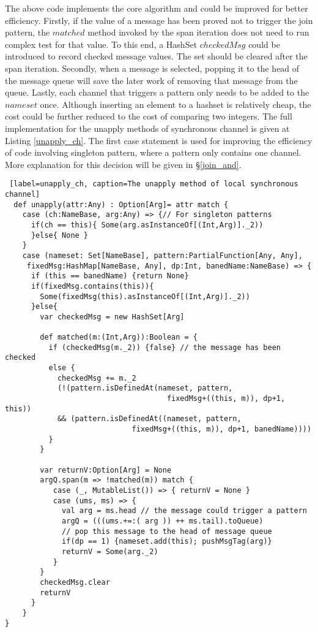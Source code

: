 The above code implements the core algorithm and could be improved for better efficiency.  Firstly, if the value of a message has been proved not to trigger the join pattern, the $matched$ method invoked by the span iteration does not need to run complex test for that value.  To this end, a HashSet $checkedMsg$ could be introduced to record checked message values.  The set should be cleared after the span iteration.  Secondly, when a message is selected, popping it to the head of the message queue will save the later work of removing that message from the queue.  Lastly, each channel that triggers a pattern only needs to be added to the $nameset$ once.  Although inserting an element to a hashset is relatively cheap, the cost could be further reduced to the cost of comparing two integers.  The full implementation for the unapply methods of synchronous channel is given at Listing \ref{unapply_ch}.  The first case statement is used for improving the efficiency of code involving singleton pattern, where a pattern only contains one channel.  More explanation for this decision will be given in \S\ref{join_and}.
 
\begin{lstlisting} [label=unapply_ch, caption=The unapply method of local synchronous channel]
  def unapply(attr:Any) : Option[Arg]= attr match { 
    case (ch:NameBase, arg:Any) => {// For singleton patterns
      if(ch == this){ Some(arg.asInstanceOf[(Int,Arg)]._2))
      }else{ None }
    }
    case (nameset: Set[NameBase], pattern:PartialFunction[Any, Any], 
     fixedMsg:HashMap[NameBase, Any], dp:Int, banedName:NameBase) => {
      if (this == banedName) {return None}      
      if(fixedMsg.contains(this)){ 
        Some(fixedMsg(this).asInstanceOf[(Int,Arg)]._2))
      }else{        
        var checkedMsg = new HashSet[Arg]
        
        def matched(m:(Int,Arg)):Boolean = {
          if (checkedMsg(m._2)) {false} // the message has been checked
          else { 
            checkedMsg += m._2
            (!(pattern.isDefinedAt(nameset, pattern, 
                                     fixedMsg+((this, m)), dp+1, this))
            && (pattern.isDefinedAt((nameset, pattern, 
                             fixedMsg+((this, m)), dp+1, banedName))))
          }
        }
        
        var returnV:Option[Arg] = None
        argQ.span(m => !matched(m)) match {
           case (_, MutableList()) => { returnV = None }
           case (ums, ms) => {
             val arg = ms.head // the message could trigger a pattern
             argQ = (((ums.+=:( arg )) ++ ms.tail).toQueue)
             // pop this message to the head of message queue
             if(dp == 1) {nameset.add(this); pushMsgTag(arg)}
             returnV = Some(arg._2)
           }
        }
        checkedMsg.clear
        returnV
      }
    }
}
\end{lstlisting}

